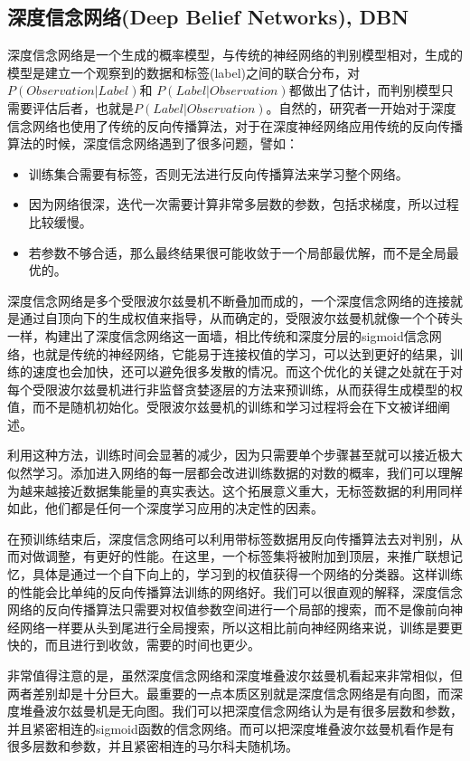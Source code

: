 \subsection{深度信念网络(Deep Belief Networks), DBN}{
	  深度信念网络是一个生成的概率模型，与传统的神经网络的判别模型相对，生成的模型是建立一个观察到的数据和标签(label)之间的联合分布，对$P(Observation|Label)$和 $P(Label|Observation)$都做出了估计，而判别模型只需要评估后者，也就是$P(Label|Observation)$。自然的，研究者一开始对于深度信念网络也使用了传统的反向传播算法，对于在深度神经网络应用传统的反向传播算法的时候，深度信念网络遇到了很多问题，譬如：
	  \begin{itemize}
	  	\item 训练集合需要有标签，否则无法进行反向传播算法来学习整个网络。
		\item 因为网络很深，迭代一次需要计算非常多层数的参数，包括求梯度，所以过程比较缓慢。
		\item 若参数不够合适，那么最终结果很可能收敛于一个局部最优解，而不是全局最优的。
	  \end{itemize} 
	  
	  深度信念网络是多个受限波尔兹曼机不断叠加而成的，一个深度信念网络的连接就是通过自顶向下的生成权值来指导，从而确定的，受限波尔兹曼机就像一个个砖头一样，构建出了深度信念网络这一面墙，相比传统和深度分层的sigmoid信念网络，也就是传统的神经网络，它能易于连接权值的学习，可以达到更好的结果，训练的速度也会加快，还可以避免很多发散的情况。而这个优化的关键之处就在于对每个受限波尔兹曼机进行非监督贪婪逐层的方法来预训练，从而获得生成模型的权值，而不是随机初始化。受限波尔兹曼机的训练和学习过程将会在下文被详细阐述。 
	  
	  利用这种方法，训练时间会显著的减少，因为只需要单个步骤甚至就可以接近极大似然学习。添加进入网络的每一层都会改进训练数据的对数的概率，我们可以理解为越来越接近数据集能量的真实表达。这个拓展意义重大，无标签数据的利用同样如此，他们都是任何一个深度学习应用的决定性的因素。
	  
	   在预训练结束后，深度信念网络可以利用带标签数据用反向传播算法去对判别，从而对做调整，有更好的性能。在这里，一个标签集将被附加到顶层，来推广联想记忆，具体是通过一个自下向上的，学习到的权值获得一个网络的分类器。这样训练的性能会比单纯的反向传播算法训练的网络好。我们可以很直观的解释，深度信念网络的反向传播算法只需要对权值参数空间进行一个局部的搜索，而不是像前向神经网络一样要从头到尾进行全局搜索，所以这相比前向神经网络来说，训练是要更快的，而且进行到收敛，需要的时间也更少。
	   
	   非常值得注意的是，虽然深度信念网络和深度堆叠波尔兹曼机看起来非常相似，但两者差别却是十分巨大。最重要的一点本质区别就是深度信念网络是有向图，而深度堆叠波尔兹曼机是无向图。我们可以把深度信念网络认为是有很多层数和参数，并且紧密相连的sigmoid函数的信念网络。而可以把深度堆叠波尔兹曼机看作是有很多层数和参数，并且紧密相连的马尔科夫随机场。
}
